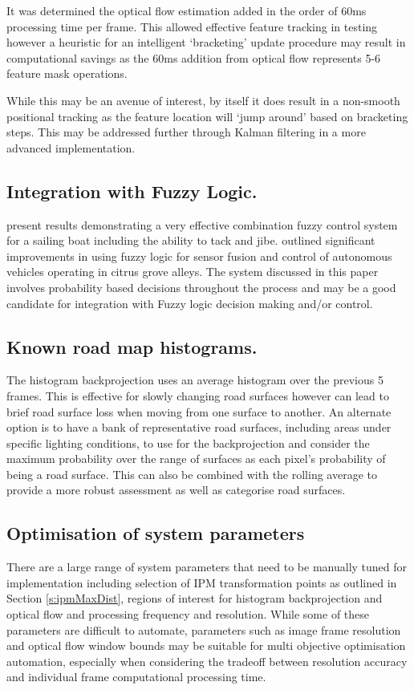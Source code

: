 \documentclass{article}
\begin{document}
It was determined the optical flow estimation added in the order of 60ms processing time per frame. This allowed effective feature tracking in testing however a heuristic for an intelligent `bracketing' update procedure may result in computational savings as the 60ms addition from optical flow represents 5-6 feature mask operations.

While this may be an avenue of interest, by itself it does result in a non-smooth positional tracking as the feature location will `jump around' based on bracketing steps. This may be addressed further through Kalman filtering in a more advanced implementation.

\subsection{Integration with Fuzzy Logic.} \citet{fuzzySail} present results demonstrating a very effective combination fuzzy control system for a sailing boat including the ability to tack and jibe. \citet{fuzzyGrove} outlined significant improvements in using fuzzy logic for sensor fusion and control of autonomous vehicles operating in citrus grove alleys. The system discussed in this paper involves probability based decisions throughout the process and may be a good candidate for integration with Fuzzy logic decision making and/or control.

\subsection{Known road map histograms.} The histogram backprojection uses an average histogram over the previous 5 frames. This is effective for slowly changing road surfaces however can lead to brief road surface loss when moving from one surface to another. An alternate option is to have a bank of representative road surfaces, including areas under specific lighting conditions, to use for the backprojection and consider the maximum probability over the range of surfaces as each pixel's probability of being a road surface. This can also be combined with the rolling average to provide a more robust assessment as well as categorise road surfaces. 

\subsection{Optimisation of system parameters}
There are a large range of system parameters that need to be manually tuned for implementation including selection of IPM transformation points as outlined in Section \ref{s:ipmMaxDist}, regions of interest for histogram backprojection and optical flow and processing frequency and resolution. While some of these parameters are difficult to automate, parameters such as image frame resolution and optical flow window bounds may be suitable for multi objective optimisation automation, especially when considering the tradeoff between resolution accuracy and individual frame computational processing time.

\newpage

\end{document}
